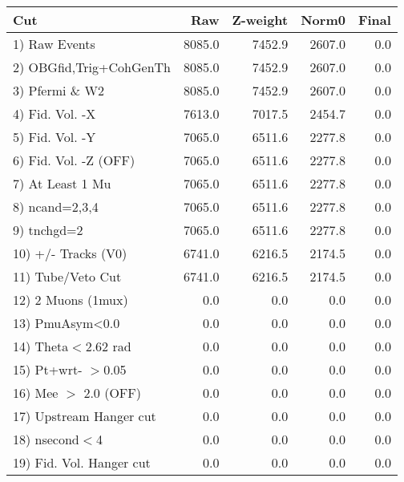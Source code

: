  \begin{table}[h!]\centering
 \begin{tabular}{||l||r|r|r|r||}
 \hline
 \hline
 Cut & Raw & Z-weight & Norm0 & Final \\
 \hline
  1) Raw Events           &      8085.0 &      7452.9 &      2607.0 &         0.0 \\
  2) OBGfid,Trig+CohGenTh &      8085.0 &      7452.9 &      2607.0 &         0.0 \\
  3) Pfermi \& W2         &      8085.0 &      7452.9 &      2607.0 &         0.0 \\
  4) Fid. Vol. -X         &      7613.0 &      7017.5 &      2454.7 &         0.0 \\
  5) Fid. Vol. -Y         &      7065.0 &      6511.6 &      2277.8 &         0.0 \\
  6) Fid. Vol. -Z (OFF)   &      7065.0 &      6511.6 &      2277.8 &         0.0 \\
  7) At Least 1 Mu        &      7065.0 &      6511.6 &      2277.8 &         0.0 \\
  8) ncand=2,3,4          &      7065.0 &      6511.6 &      2277.8 &         0.0 \\
  9) tnchgd=2             &      7065.0 &      6511.6 &      2277.8 &         0.0 \\
 10) +/- Tracks (V0)      &      6741.0 &      6216.5 &      2174.5 &         0.0 \\
 11) Tube/Veto Cut        &      6741.0 &      6216.5 &      2174.5 &         0.0 \\
 12) 2 Muons (1mux)       &         0.0 &         0.0 &         0.0 &         0.0 \\
 13) PmuAsym<0.0          &         0.0 &         0.0 &         0.0 &         0.0 \\
 14) Theta$<$2.62 rad     &         0.0 &         0.0 &         0.0 &         0.0 \\
 15) Pt+wrt- $>$0.05      &         0.0 &         0.0 &         0.0 &         0.0 \\
 16) Mee $>$ 2.0  (OFF)   &         0.0 &         0.0 &         0.0 &         0.0 \\
 17) Upstream Hanger cut  &         0.0 &         0.0 &         0.0 &         0.0 \\
 18) nsecond$<$4          &         0.0 &         0.0 &         0.0 &         0.0 \\
 19) Fid. Vol. Hanger cut &         0.0 &         0.0 &         0.0 &         0.0 \\

\end{tabular}
\end{table}
